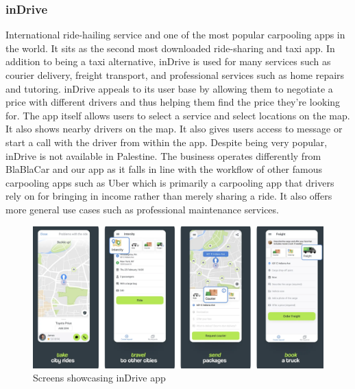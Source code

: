\documentclass[a4paper, 12pt]{article} %
\begin{document}
            \subsubsection{inDrive}
                International ride-hailing service and one of the most popular carpooling apps in the world. It sits as the second most downloaded ride-sharing and taxi app. \cite{indrive_wiki} In addition to being a taxi alternative, inDrive is used for many services such as courier delivery, freight transport, and professional services such as home repairs and tutoring. inDrive appeals to its user base by allowing them to negotiate a price with different drivers and thus helping them find the price they're looking for. The app itself allows users to select a service and select locations on the map. It also shows nearby drivers on the map. It also gives users access to message or start a call with the driver from within the app.\cite{indrive_itunes} Despite being very popular, inDrive is not available in Palestine. The business operates differently from BlaBlaCar and our app as it falls in line with the workflow of other famous carpooling apps such as Uber which is primarily a carpooling app that drivers rely on for bringing in income rather than merely sharing a ride. It also offers more general use cases such as professional maintenance services.
                \begin{figure}[h]
                    \centering
                    \includegraphics[width=0.9\linewidth]{Images/inDrive_Overview.png}
                    \caption{Screens showcasing inDrive app \cite{indrive_itunes}}
                    \label{indrvie_galary}
                \end{figure}
            \pagebreak    
\end{document}
